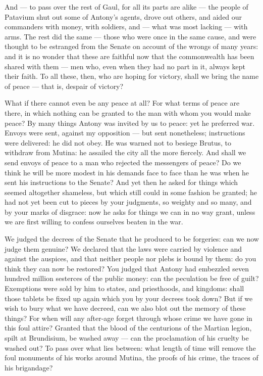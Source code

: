  And --- to pass over the rest of Gaul, for all its parts are alike --- the people of Patavium shut out some of Antony's agents, drove out others, and aided our commanders with money, with soldiers, and --- what was most lacking --- with arms. The rest did the same --- those who were once in the same cause, and were thought to be estranged from the Senate on account of the wrongs of many years: and it is no wonder that these are faithful now that the commonwealth has been shared with them --- men who, even when they had no part in it, always kept their faith. To all these, then, who are hoping for victory, shall we bring the name of peace --- that is, despair of victory?

 What if there cannot even be any peace at all? For what terms of peace are there, in which nothing can be granted to the man with whom you would make peace? By many things Antony was invited by us to peace: yet he preferred war. Envoys were sent, against my opposition --- but sent nonetheless; instructions were delivered: he did not obey. He was warned not to besiege Brutus, to withdraw from Mutina: he assailed the city all the more fiercely. And shall we send envoys of peace to a man who rejected the messengers of peace? Do we think he will be more modest in his demands face to face than he was when he sent his instructions to the Senate? And yet then he asked for things which seemed altogether shameless, but which still could in some fashion be granted; he had not yet been cut to pieces by your judgments, so weighty and so many, and by your marks of disgrace: now he asks for things we can in no way grant, unless we are first willing to confess ourselves beaten in the war.

 We judged the decrees of the Senate that he produced to be forgeries: can we now judge them genuine? We declared that the laws were carried by violence and against the auspices, and that neither people nor plebs is bound by them: do you think they can now be restored? You judged that Antony had embezzled seven hundred million sesterces of the public money: can the peculation be free of guilt? Exemptions were sold by him to states, and priesthoods, and kingdoms: shall those tablets be fixed up again which you by your decrees took down? But if we wish to bury what we have decreed, can we also blot out the memory of these things? For when will any after-age forget through whose crime we have gone in this foul attire? Granted that the blood of the centurions of the Martian legion, spilt at Brundisium, be washed away --- can the proclamation of his cruelty be washed out? To pass over what lies between: what length of time will remove the foul monuments of his works around Mutina, the proofs of his crime, the traces of his brigandage?

